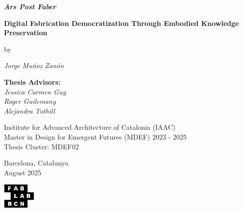 \begin{titlepage}
\centering
\vspace*{2.5cm}

{\fontsize{24}{28}\selectfont\textbf{\textit{Ars Post Faber}}}

\vspace{0.3cm}

{\fontsize{18}{22}\selectfont\textbf{Digital Fabrication Democratization Through Embodied Knowledge Preservation}}

\vspace{0.4cm}

{\fontsize{14}{16}\selectfont by}

\vspace{0.4cm}

{\fontsize{14}{20}\selectfont\textit{Jorge Muñoz Zanón}}

\vspace{1.5cm}

{\fontsize{14}{15}\selectfont
\textbf{Thesis Advisors:}\\[0.1cm]
\textit{Jessica Carmen Guy\\
Roger Guilemany\\
Alejandra Tothill}
}

\vspace{2cm}

{\fontsize{12}{15}\selectfont
Institute for Advanced Architecture of Catalonia (IAAC)\\[0.05cm]
Master in Design for Emergent Futures (MDEF) 2023 - 2025\\[0.05cm]
Thesis Cluster: MDEF02
}

\vspace{2cm}

{\fontsize{14}{16}\selectfont Barcelona, Catalunya\\[0.05cm]
August 2025}

\vspace{3cm}

\begin{center}
\hspace{1.4cm}
\includegraphics[height=1.3cm]{figures/logo/fablabbcn-logo.pdf}
\end{center}

\end{titlepage}